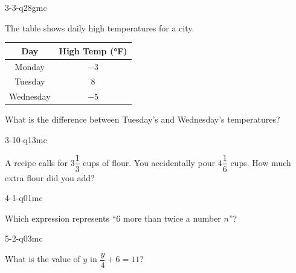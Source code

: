 \begin{practiceQuestion}{3-3-q28}{gmc}
\begin{questionText}
The table shows daily high temperatures for a city.

\begin{center}
\begin{tabular}{|c|c|}
\hline
\textbf{Day} & \textbf{High Temp (°F)} \\
\hline
Monday & $-3$ \\
\hline
Tuesday & $8$ \\
\hline
Wednesday & $-5$ \\
\hline
\end{tabular}
\end{center}

What is the difference between Tuesday's and Wednesday's temperatures?
\end{questionText}
\end{practiceQuestion}

\begin{practiceQuestion}{3-10-q13}{mc}
\begin{questionText}
A recipe calls for $3\dfrac{1}{3}$ cups of flour. You accidentally pour $4\dfrac{1}{6}$ cups. How much extra flour did you add?
\end{questionText}
\end{practiceQuestion}

\begin{practiceQuestion}{4-1-q01}{mc}
\begin{questionText}
Which expression represents ``$6$ more than twice a number $n$''?
\end{questionText}
\end{practiceQuestion}

\begin{practiceQuestion}{5-2-q03}{mc}
\begin{questionText}
What is the value of $y$ in $\dfrac{y}{4} + 6 = 11$?
\end{questionText}
\end{practiceQuestion}

